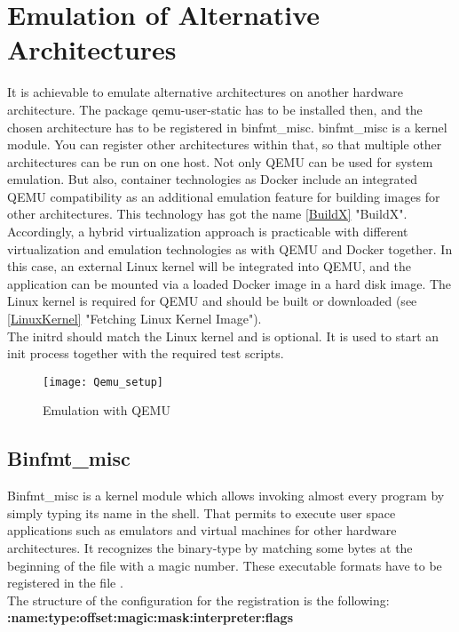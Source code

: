\section{Emulation of Alternative Architectures}

It is achievable to emulate alternative architectures on another hardware architecture. The package qemu-user-static has to be installed then, and the chosen architecture has to be registered in binfmt\_misc. binfmt\_misc is a kernel module. 
You can register other architectures within that, so that multiple other architectures can be run on one host. 
Not only QEMU can be used for system emulation. But also, container technologies as Docker include an integrated QEMU compatibility as an additional emulation feature for building images for other architectures. 
This technology has got the name \ref{BuildX} "BuildX". Accordingly, a hybrid virtualization approach is practicable with different virtualization and emulation technologies as with QEMU and Docker together. In this case, an external Linux kernel will be integrated into QEMU, and the application can be mounted via a loaded Docker image in a hard disk image. 
The Linux kernel is required for QEMU and should be built or downloaded (see \ref{LinuxKernel} "Fetching Linux Kernel Image").\\
The initrd should match the Linux kernel and is optional. It is used to start an init process together with the required test scripts. \\

\begin{figure}[H]
\centering
\texttt{[image: Qemu\_setup]}
 \caption{Emulation with QEMU}
    \label{QEMU_Emulation}
\end{figure}


\newpage
\subsection{Binfmt\_misc}

Binfmt\_misc is a kernel module which allows invoking almost every program by simply typing its name in the shell. That permits to execute user space applications such as emulators and virtual machines for other hardware architectures. It recognizes the binary-type by matching some bytes at the beginning of the file with a magic number. These executable formats have to be registered in the file .\\
The structure of the configuration for the registration is the following: \\ \textbf{:name:type:offset:magic:mask:interpreter:flags} 

